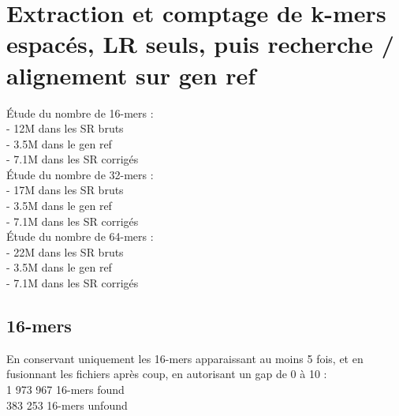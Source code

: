 \documentclass[12pt]{article}
\begin{document}
\section{Extraction et comptage de k-mers espacés, LR seuls, puis recherche / alignement sur gen ref}

Étude du nombre de 16-mers : \\
- 12M dans les SR bruts \\
- 3.5M dans le gen ref \\
- 7.1M dans les SR corrigés \\

Étude du nombre de 32-mers : \\
- 17M dans les SR bruts \\
- 3.5M dans le gen ref \\
- 7.1M dans les SR corrigés \\

Étude du nombre de 64-mers : \\
- 22M dans les SR bruts \\
- 3.5M dans le gen ref \\
- 7.1M dans les SR corrigés \\

\subsection{16-mers}

En conservant uniquement les 16-mers apparaissant au moins 5 fois, et en fusionnant les fichiers après coup, en autorisant un gap de 0 à 10 : \\

1 973 967 16-mers found \\
 383 253 16-mers unfound
\end{document}
